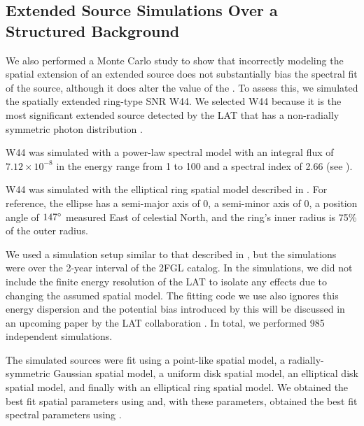 \subsection{Extended Source Simulations Over a Structured Background}

We also performed a Monte Carlo study to show that incorrectly modeling the
spatial extension of an extended source does not substantially bias
the spectral fit of the source, although it does alter the value of the \ts.
To assess this, we simulated the spatially extended ring-type SNR W44.
We selected W44 because it is the most significant extended source detected by the LAT 
that has a non-radially symmetric photon distribution \citep{abdo_2010a_gamma-ray-emission}. 

W44 was simulated with a power-law spectral model with an integral flux
of $7.12\times10^{-8}$ \fluxunits in the energy range from 1 \gev to 100
\gev and a spectral index of 2.66 (see ).

W44 was simulated with the elliptical ring spatial model described in
\cite{abdo_2010a_gamma-ray-emission}. For reference, the ellipse has a semi-major axis of 0,
a semi-minor axis of 0, a position angle of $147^\circ$
measured East of celestial North, and the ring's inner radius is 75\% of
the outer radius.

We used a simulation setup similar to that described in
, but the simulations
were over the 2-year interval of the 2FGL catalog.
In the simulations, 
we did not include the finite energy resolution of the LAT
to isolate any effects due to changing the assumed spatial model. 
The fitting code we use also ignores this energy dispersion and the
potential bias introduced by this will be discussed in an upcoming paper
by the LAT collaboration \citep{ackermann_2012a_fermi-large}.
In total, we performed 985 independent simulations.

The simulated sources were fit using a point-like spatial model,
a radially-symmetric Gaussian spatial model, a uniform disk spatial model, 
an elliptical disk spatial model, and finally with an elliptical
ring spatial model.
We obtained the best fit spatial parameters using \pointlike and, 
with these parameters, obtained the best fit spectral parameters 
using \gtlike. 

